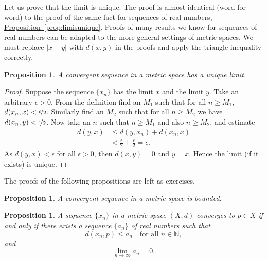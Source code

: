 \documentclass[12pt]{book}
\newcommand{\abs}[1]{\left\lvert {#1} \right\rvert}
\newcommand{\N}{{\mathbb{N}}}
\theoremstyle{plain}
\newtheorem{prop}[thm]{Proposition}
\theoremstyle{remark}
\theoremstyle{definition}
\theoremstyle{exercise}
\theoremstyle{example}
\newcommand{\propref}[1]{\hyperref[#1]{Proposition~\ref*{#1}}}
\begin{document}
Let us prove that the limit is unique.  The proof is almost
identical (word for word) to the proof of the same fact for sequences of
real numbers,
\propref{prop:limisunique}.
Proofs of many results we know for sequences of real numbers can be
adapted to
the more general settings of metric spaces.  We must replace $\abs{x-y}$
with $d(x,y)$ in the proofs and apply the triangle inequality correctly.

\begin{prop} \label{prop:mslimisunique}
A convergent sequence in a metric space has a unique limit.
\end{prop}

\begin{proof}
Suppose the sequence $\{ x_n \}$ has the limit $x$ and the limit $y$.
Take an arbitrary $\epsilon > 0$.
From the definition find an $M_1$ such that for all $n \geq M_1$,
$d(x_n,x) < \nicefrac{\epsilon}{2}$.  Similarly find an $M_2$
such that for all $n \geq M_2$ we have
$d(x_n,y) < \nicefrac{\epsilon}{2}$.  Now take an $n$ such that
$n \geq M_1$ and also $n \geq M_2$, and estimate
\begin{equation*}
\begin{split}
d(y,x)
& \leq
d(y,x_n) + d(x_n,x) \\
& <
\frac{\epsilon}{2} + \frac{\epsilon}{2} = \epsilon .
\end{split}
\end{equation*}
As $d(y,x) < \epsilon$ for all $\epsilon > 0$, then $d(x,y) = 0$
and $y=x$.  Hence the limit (if it exists) is unique.
\end{proof}

The proofs of the following propositions are left as exercises.

\begin{prop} \label{prop:msconvbound}
A convergent sequence in a metric space is bounded.
\end{prop}

\begin{prop} \label{prop:msconvifa}
A sequence $\{ x_n \}$ in a metric space $(X,d)$ converges to $p \in X$
if and only
if there exists a sequence $\{ a_n \}$ of real numbers such that
\begin{equation*}
d(x_n,p) \leq a_n \quad \text{for all $n \in \N$},
\end{equation*}
and
\begin{equation*}
\lim_{n\to\infty} a_n = 0.
\end{equation*}
\end{prop}
\end{document}
